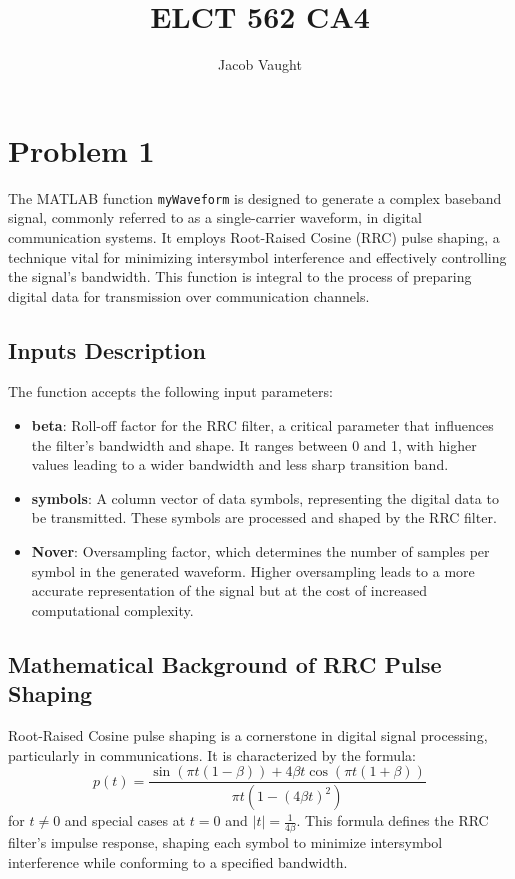 \documentclass{article}
\title{ELCT 562 CA4}
\author{Jacob Vaught}
\date{}
\begin{document}
\maketitle

\section{Problem 1}
The MATLAB function \texttt{myWaveform} is designed to generate a complex baseband signal, commonly referred to as a single-carrier waveform, in digital communication systems. It employs Root-Raised Cosine (RRC) pulse shaping, a technique vital for minimizing intersymbol interference and effectively controlling the signal's bandwidth. This function is integral to the process of preparing digital data for transmission over communication channels.

\subsection{Inputs Description}
The function accepts the following input parameters:
\begin{itemize}
    \item \textbf{beta}: Roll-off factor for the RRC filter, a critical parameter that influences the filter's bandwidth and shape. It ranges between 0 and 1, with higher values leading to a wider bandwidth and less sharp transition band.
    \item \textbf{symbols}: A column vector of data symbols, representing the digital data to be transmitted. These symbols are processed and shaped by the RRC filter.
    \item \textbf{Nover}: Oversampling factor, which determines the number of samples per symbol in the generated waveform. Higher oversampling leads to a more accurate representation of the signal but at the cost of increased computational complexity.
\end{itemize}

\subsection{Mathematical Background of RRC Pulse Shaping}
Root-Raised Cosine pulse shaping is a cornerstone in digital signal processing, particularly in communications. It is characterized by the formula:
\[ p(t) = \frac{\sin(\pi t (1 - \beta)) + 4 \beta t \cos(\pi t (1 + \beta))}{\pi t (1 - (4 \beta t)^2)} \]
for \( t \neq 0 \) and special cases at \( t = 0 \) and \( |t| = \frac{1}{4\beta} \). This formula defines the RRC filter's impulse response, shaping each symbol to minimize intersymbol interference while conforming to a specified bandwidth.
\end{document}

